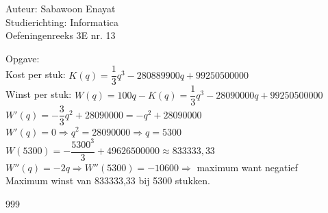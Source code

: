 \documentclass[a4paper]{article}
\begin{document}
  
\noindent \large Auteur: Sabawoon Enayat      \\
\noindent \large Studierichting: Informatica  \\
\noindent \large Oefeningenreeks 3E nr. 13 \\

\medskip

\normalsize

Opgave:\\

Kost per stuk: $K(q) = \dfrac{1}{3}q^3 - 280889900q + 99250500000$\\

Winst per stuk: $W(q) = 100q - K(q) = \dfrac{1}{3}q^3 - 28090000q + 99250500000$\\

$W'(q) = -\dfrac{3}{3}q^2 + 28090000 = -q^2 + 28090000$\\

$W'(q) = 0 \Rightarrow q^2 = 28090000 \Rightarrow q = 5300$\\

$W(5300) = -\dfrac{5300^3}{3} + 49626500000 \approx 833333,33$\\

$W''(q) = -2q \Rightarrow W''(5300) = -10600 \Rightarrow$ maximum want negatief\\

Maximum winst van 833333,33 bij 5300 stukken.

\begin{thebibliography}{999}
\end{thebibliography}
\end{document}
